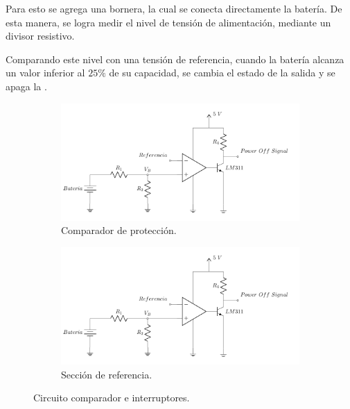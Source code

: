 Para esto se agrega una bornera, la cual se conecta directamente la batería. De esta manera, se logra medir el nivel de tensión de alimentación, mediante un divisor resistivo.

Comparando este nivel con una tensión de referencia, cuando la batería alcanza un valor inferior al $25\%$ de su capacidad, se cambia el estado de la salida y se apaga la \rspi.
\begin{figure}[H]
\centering
	\begin{subfigure}{0.7\textwidth}
    	\centering
        \includegraphics[width=\linewidth, page=1]{ImagenesIngenieria de Detalle/CircuitoProteccion}
		\caption{Comparador de protección.}
	\end{subfigure}      
        
    \begin{subfigure}{0.5\textwidth}
    	\centering
        \includegraphics[width=\linewidth, page=2]{ImagenesIngenieria de Detalle/CircuitoProteccion}				\caption{Sección de referencia.}
    \end{subfigure}
	\caption{Circuito comparador e interruptores.}
	\label{fig:Comp}
\end{figure}

